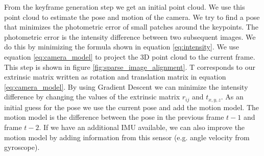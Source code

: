 \documentclass[11pt,a4paper,titlepage,oneside]{report}
\begin{document}
From the keyframe generation step we get an initial point cloud. We use this point cloud to estimate the pose and motion of the camera. We try to find a pose that minimizes the photometric error of small patches around the keypoints. The photometric error is the intensity difference between two subsequent images. We do this by minimizing the formula shown in equation \ref{eq:intensity}. We use equation \ref{eq:camera_model} to project the 3D point cloud to the current frame. This step is shown in figure \ref{fig:sparse_image_alignment}. T corresponds to our extrinsic matrix written as rotation and translation matrix in equation \ref{eq:camera_model}. By using Gradient Descent we can minimize the intensity difference by changing the values of the extrinsic matrix $r_{ij}$ and $t_{x,y,z}$. As an initial guess for the pose we use the current pose and add the motion model. The motion model is the difference between the pose in the previous frame $t-1$ and frame $t-2$. If we have an additional IMU available, we can also improve the motion model by adding information from this sensor (e.g. angle velocity from gyroscope).
\end{document}
